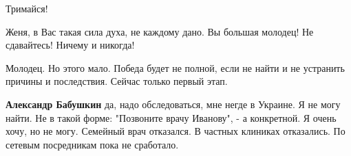 \begin{itemize}
Тримайся!

 
Женя, в Вас такая сила духа, не каждому дано. Вы большая молодец! Не
сдавайтесь! Ничему и никогда!

 
Молодец. Но этого мало. Победа будет не полной, если не найти и не устранить
причины и последствия. Сейчас только первый этап.

\begin{itemize}
 
\textbf{Александр Бабушкин} да, надо обследоваться, мне негде в Украине. Я не
могу найти. Не в такой форме: "Позвоните врачу Иванову", - а конкретной. Я
очень хочу, но не могу. Семейный врач отказался. В частных клиниках отказались.
По сетевым посредникам пока не сработало.
\end{itemize}

\end{itemize}

